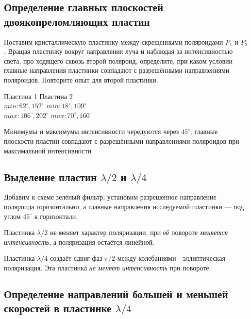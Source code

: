 \documentclass[a4paper]{article}
\begin{document}
\subsection{Определение главных плоскостей двоякопреломляющих пластин}
Поставим кристаллическую пластинку
между скрещенными поляроидами $P_1$ и $P_2$. Вращая пластинку вокруг направления луча
и наблюдая за интенсивностью света, про
ходящего сквозь второй поляроид, определите, при
каком условии главные направления пластинки
совпадают с разрешёнными направлениями поляроидов. Повторите опыт для второй пластинки.

\begin{center}
    Пластина 1 \hspace{1cm} Пластина 2 \\
    $min: 62^{\circ}, 152^{\circ}$ \hspace {1cm} $min: 18^{\circ}, 109^{\circ}$ \\
     $max: 106^{\circ}, 202^{\circ}$ \hspace {1cm} $max: 70^{\circ}, 160^{\circ}$
\end{center}
Минимумы и максимумы интенсивности чередуются через $45^{\circ}$, главные плоскости пластин совпадают с разрешёнными направлениями поляроидов при максимальной интенсивности

\subsection{Выделение пластин $\lambda/2$ и $\lambda/4$}
Добавим к схеме зелёный фильтр; установим
разрешённое направление поляроида горизонтально, а главные направления исследуемой пластинки — под углом $45^{\circ}$ к горизонтали. 
\par Пластинка $\lambda/2$ не меняет характер поляризации, при её повороте \textit{меняется интенсивность}, а поляризация остаётся линейной. 
\par Пластинка $\lambda/4$ создаёт сдвиг фаз $\pi/2$ между колебаниями - эллиптическая поляризация. Эта пластинка \textit{не меняет интенсивность} при повороте.

\subsection{Определение направлений большей и меньшей скоростей в пластинке $\lambda/4$}
\end{document}
